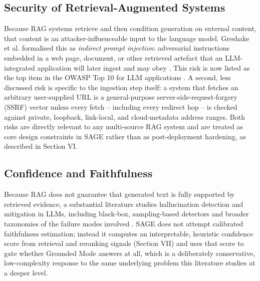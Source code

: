 \documentclass[conference]{IEEEtran}
\begin{document}
\subsection{Security of Retrieval-Augmented Systems}
Because RAG systems retrieve and then condition generation on external
content, that content is an attacker-influenceable input to the
language model. Greshake et al. formalised this as \emph{indirect prompt
injection}: adversarial instructions embedded in a web page, document,
or other retrieved artefact that an LLM-integrated application will
later ingest and may obey \cite{greshake2023injection}. This risk is now
listed as the top item in the OWASP Top 10 for LLM applications
\cite{owasp2025llm01}. A second, less discussed risk is specific to the
ingestion step itself: a system that fetches an arbitrary user-supplied
URL is a general-purpose server-side-request-forgery (SSRF) vector
unless every fetch -- including every redirect hop -- is checked against
private, loopback, link-local, and cloud-metadata address ranges. Both
risks are directly relevant to any multi-source RAG system and are
treated as core design constraints in SAGE rather than as
post-deployment hardening, as described in Section VI.

\subsection{Confidence and Faithfulness}
Because RAG does not guarantee that generated text is fully supported
by retrieved evidence, a substantial literature studies hallucination
detection and mitigation in LLMs, including black-box, sampling-based
detectors and broader taxonomies of the failure modes involved
\cite{huang2024hallucination}. SAGE does not attempt calibrated
faithfulness estimation; instead it computes an interpretable, heuristic
confidence score from retrieval and reranking signals (Section VII) and
uses that score to gate whether Grounded Mode answers at all, which is a
deliberately conservative, low-complexity response to the same
underlying problem this literature studies at a deeper level.
\end{document}
